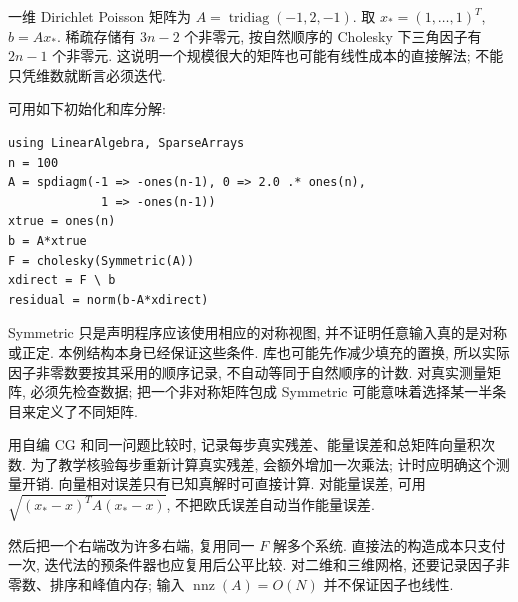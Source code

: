 一维 Dirichlet Poisson 矩阵为 $A=\operatorname{tridiag}(-1,2,-1)$. 取 $x_*=(1,\ldots,1)^T$, $b=Ax_*$. 稀疏存储有 $3n-2$ 个非零元, 按自然顺序的 Cholesky 下三角因子有 $2n-1$ 个非零元. 这说明一个规模很大的矩阵也可能有线性成本的直接解法; 不能只凭维数就断言必须迭代.

可用如下初始化和库分解:
\begin{verbatim}
using LinearAlgebra, SparseArrays
n = 100
A = spdiagm(-1 => -ones(n-1), 0 => 2.0 .* ones(n),
             1 => -ones(n-1))
xtrue = ones(n)
b = A*xtrue
F = cholesky(Symmetric(A))
xdirect = F \ b
residual = norm(b-A*xdirect)
\end{verbatim}
Symmetric 只是声明程序应该使用相应的对称视图, 并不证明任意输入真的是对称或正定. 本例结构本身已经保证这些条件. 库也可能先作减少填充的置换, 所以实际因子非零数要按其采用的顺序记录, 不自动等同于自然顺序的计数. 对真实测量矩阵, 必须先检查数据; 把一个非对称矩阵包成 Symmetric 可能意味着选择某一半条目来定义了不同矩阵.

用自编 CG 和同一问题比较时, 记录每步真实残差、能量误差和总矩阵向量积次数. 为了教学核验每步重新计算真实残差, 会额外增加一次乘法; 计时应明确这个测量开销. 向量相对误差只有已知真解时可直接计算. 对能量误差, 可用 $\sqrt{(x_*-x)^TA(x_*-x)}$, 不把欧氏误差自动当作能量误差.

然后把一个右端改为许多右端, 复用同一 $F$ 解多个系统. 直接法的构造成本只支付一次, 迭代法的预条件器也应复用后公平比较. 对二维和三维网格, 还要记录因子非零数、排序和峰值内存; 输入 $\operatorname{nnz}(A)=O(N)$ 并不保证因子也线性.

